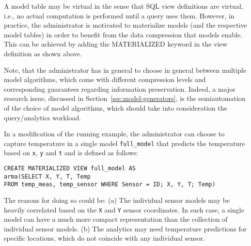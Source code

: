 A model table may be virtual in the sense that SQL view definitions are virtual, i.e., no actual computation is performed until a query uses them. However, in practice, the administrator is motivated to materialize models (and the  respective model tables) in order to benefit from the data compression that models enable. This can be achieved by adding the MATERIALIZED keyword in the view definition as shown above.

Note, that the administrator has in general to choose in general between multiple model algorithms, which come with different compression levels and corresponding guarantees regarding information preservation. Indeed, a major research issue, discussed in Section~\ref{sec:model-generators}, is the semiautomation of the choice of model algorithms, which should take into consideration the query/analytics workload.

\vspace*{0.5cm}
\begin{example}
In a modification of the running example, the administrator can choose to capture temperature in a single model \texttt{full\_model} that predicts the temperature based on \texttt{x}, \texttt{y} and \texttt{t} and is defined as follows:
\begin{verbatim}
CREATE MATERIALIZED VIEW full_model AS 
arma(SELECT X, Y, T, Temp
FROM temp_meas, temp_sensor WHERE Sensor = ID; X, Y, T; Temp)
\end{verbatim}

The reasons for doing so could be: (a) The individual sensor models may be heavily correlated based on the \texttt{X} and \texttt{Y} sensor coordinates. In such case, a single model can have a much more compact representation than the collection of individual sensor models.
(b) The analytics may need temperature predictions for specific locations, which do not coincide with any individual sensor.
\end{example}
\vspace*{0.5cm}


